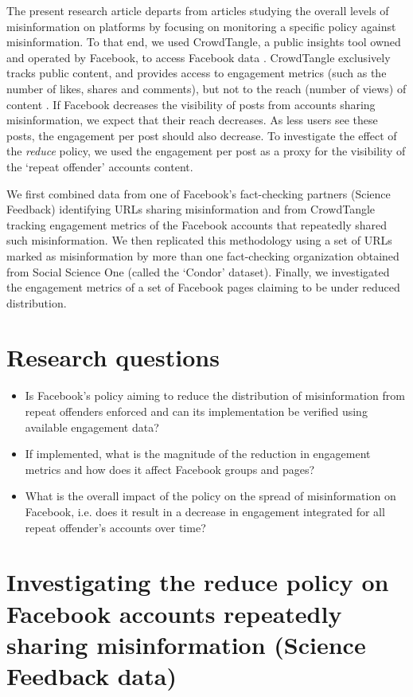 \documentclass[review]{elsarticle}
\begin{document}
The present research article departs from articles studying the overall levels of misinformation on platforms by focusing on monitoring a specific policy against misinformation.
To that end, we used CrowdTangle, a public insights tool owned and operated by Facebook, to access Facebook data \citep{team2020crowdtangle}. 
CrowdTangle exclusively tracks public content, and provides access to engagement metrics (such as the number of likes, shares and comments), but not to the reach (number of views) of content \citep{helpCT}.
If Facebook decreases the visibility of posts from accounts sharing misinformation, we expect that their reach decreases.
As less users see these posts, the engagement per post should also decrease.
To investigate the effect of the {\it reduce} policy, we used the engagement per post as a proxy for the visibility of the `repeat offender' accounts content.
 
We first combined data from one of Facebook's fact-checking partners (Science Feedback) identifying URLs sharing misinformation and from CrowdTangle tracking engagement metrics of the Facebook accounts that repeatedly shared such misinformation.
We then replicated this methodology using a set of URLs marked as misinformation by more than one fact-checking organization obtained from Social Science One (called the `Condor' dataset).
Finally, we investigated the engagement metrics of a set of Facebook pages claiming to be under reduced distribution.

\section{Research questions}

\begin{itemize}
\item Is Facebook’s policy aiming to reduce the distribution of misinformation from repeat offenders enforced and can its implementation be verified using available engagement data?
\item If implemented, what is the magnitude of the reduction in engagement metrics and how does it affect Facebook groups and pages?
\item What is the overall impact of the policy on the spread of misinformation on Facebook, i.e. does it result in a  decrease in engagement integrated for all repeat offender’s accounts over time?
\end{itemize}

\section{Investigating the reduce policy on Facebook accounts repeatedly sharing misinformation (Science Feedback data)}
\end{document}

